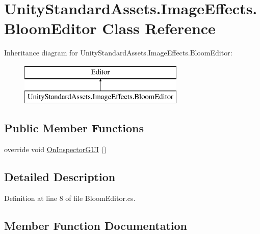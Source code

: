 \hypertarget{class_unity_standard_assets_1_1_image_effects_1_1_bloom_editor}{}\section{Unity\+Standard\+Assets.\+Image\+Effects.\+Bloom\+Editor Class Reference}
\label{class_unity_standard_assets_1_1_image_effects_1_1_bloom_editor}
Inheritance diagram for Unity\+Standard\+Assets.\+Image\+Effects.\+Bloom\+Editor\+:\begin{figure}[H]
\begin{center}
\leavevmode
\includegraphics[height=2.000000cm]{class_unity_standard_assets_1_1_image_effects_1_1_bloom_editor}
\end{center}
\end{figure}
\subsection*{Public Member Functions}
\begin{DoxyCompactItemize}
\item 
override void \mbox{\hyperlink{class_unity_standard_assets_1_1_image_effects_1_1_bloom_editor_a5f190c6bd7eeabcb08738e8e28ecc9f1}{On\+Inspector\+G\+UI}} ()
\end{DoxyCompactItemize}


\subsection{Detailed Description}


Definition at line 8 of file Bloom\+Editor.\+cs.



\subsection{Member Function Documentation}
\mbox{\label{class_unity_standard_assets_1_1_image_effects_1_1_bloom_editor_a5f190c6bd7eeabcb08738e8e28ecc9f1}} 
